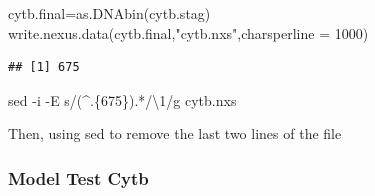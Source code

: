 \documentclass[
]{article}
\newenvironment{Shaded}{\begin{snugshade}}{\end{snugshade}}
\newcommand{\AttributeTok}[1]{\textcolor[rgb]{0.77,0.63,0.00}{#1}}
\newcommand{\DecValTok}[1]{\textcolor[rgb]{0.00,0.00,0.81}{#1}}
\newcommand{\FunctionTok}[1]{\textcolor[rgb]{0.00,0.00,0.00}{#1}}
\newcommand{\NormalTok}[1]{#1}
\newcommand{\OperatorTok}[1]{\textcolor[rgb]{0.81,0.36,0.00}{\textbf{#1}}}
\newcommand{\OtherTok}[1]{\textcolor[rgb]{0.56,0.35,0.01}{#1}}
\newcommand{\SpecialCharTok}[1]{\textcolor[rgb]{0.00,0.00,0.00}{#1}}
\newcommand{\StringTok}[1]{\textcolor[rgb]{0.31,0.60,0.02}{#1}}
\newcommand{\VariableTok}[1]{\textcolor[rgb]{0.00,0.00,0.00}{#1}}
\begin{document}
\begin{Shaded}
\begin{Highlighting}[]
\NormalTok{cytb.final}\OtherTok{=}\FunctionTok{as.DNAbin}\NormalTok{(cytb.stag)}
\FunctionTok{write.nexus.data}\NormalTok{(cytb.final,}\StringTok{"cytb.nxs"}\NormalTok{,}\AttributeTok{charsperline =} \DecValTok{1000}\NormalTok{)}
\end{Highlighting}
\end{Shaded}

\begin{Shaded}
\end{Shaded}

\begin{verbatim}
## [1] 675
\end{verbatim}

\begin{Shaded}
\begin{Highlighting}[]
\FunctionTok{sed} \AttributeTok{{-}i} \AttributeTok{{-}E} \StringTok{\textquotesingle{}s/(\^{}.\{675\}).*/\textbackslash{}1/g\textquotesingle{}}\NormalTok{ cytb.nxs}
\end{Highlighting}
\end{Shaded}

Then, using sed to remove the last two lines of the file

\begin{Shaded}
\end{Shaded}

\hypertarget{model-test-cytb}{%
\subsubsection{Model Test Cytb}\label{model-test-cytb}}

\begin{Shaded}
\end{Shaded}
\end{document}
